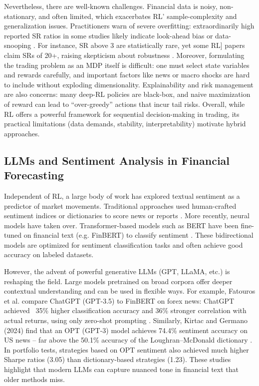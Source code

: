 Nevertheless, there are well-known challenges. Financial data is noisy, non-stationary, and often limited, which exacerbates \gls{RL}' sample-complexity and generalization issues. Practitioners warn of severe overfitting: extraordinarily high reported \gls{SR} ratios in some studies likely indicate look-ahead bias or data-snooping \cite{Nikolaos2025}. For instance, \gls{SR} above 3 are statistically rare, yet some \gls{RL}] papers claim \gls{SR}s of 20+, raising skepticism about robustness \cite{Nikolaos2025}. Moreover, formulating the trading problem as an \gls{MDP} itself is difficult: one must select state variables and rewards carefully, and important factors like news or macro shocks are hard to include without exploding dimensionality. Explainability and risk management are also concerns: many deep-\gls{RL} policies are black-box, and naive maximization of reward can lead to “over-greedy” actions that incur tail risks. Overall, while RL offers a powerful framework for sequential decision-making in trading, its practical limitations (data demands, stability, interpretability) motivate hybrid approaches.

\subsection{LLMs and Sentiment Analysis in Financial Forecasting}
Independent of \gls{RL}, a large body of work has explored textual sentiment as a predictor of market movements. Traditional approaches used human-crafted sentiment indices or dictionaries  to score news or reports \cite{Loughran2011}. More recently, neural models have taken over. Transformer-based models such as \gls{BERT} have been fine-tuned on financial text (e.g. FinBERT) to classify sentiment \cite{Kirtac2024, Fatouros2023}. These bidirectional models are optimized for sentiment classification tasks and often achieve good accuracy on labeled datasets.

However, the advent of powerful generative \gls{LLM}s (GPT, LLaMA, etc.) is reshaping the field. Large models pretrained on broad corpora offer deeper contextual understanding and can be used in flexible ways. For example, Fatouros et al. compare ChatGPT (GPT-3.5) to FinBERT on forex news: ChatGPT achieved ~35\% higher classification accuracy and 36\% stronger correlation with actual returns, using only zero-shot prompting \cite{Fatouros2023}. Similarly, Kirtac and Germano (2024) find that an OPT (GPT-3) model achieves 74.4\% sentiment accuracy on US news – far above the 50.1\% accuracy of the Loughran–McDonald dictionary \cite{Kirtac2024}. In portfolio tests, strategies based on OPT sentiment also achieved much higher Sharpe ratios (3.05) than dictionary-based strategies (1.23). These studies highlight that modern LLMs can capture nuanced tone in financial text that older methods miss.


